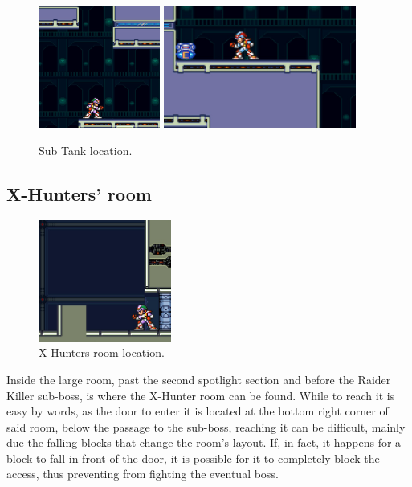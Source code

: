 \begin{figure}[htp]
	\centering
	\includegraphics[height=4cm]{figures/X2/Magna_centipede/Centipede_tank_1.png}
	\includegraphics[height=4cm]{figures/X2/Magna_centipede/Centipede_tank.png}
	\caption{Sub Tank location.}
\end{figure}

\subsection{X-Hunters' room}
\begin{figure}[htp]
	\centering
	\includegraphics[height=4cm]{figures/X2/Magna_centipede/Centipede_Hunter_room.png}
	\caption{X-Hunters room location.}
\end{figure}
Inside the large room, past the second spotlight section and before the Raider Killer sub-boss, is where the X-Hunter room can be found. While to reach it is easy by words, as the door to enter it is located at the bottom right corner of said room, below the passage to the sub-boss, reaching it can be difficult, mainly due the falling blocks that change the room's layout. If, in fact, it happens for a block to fall in front of the door, it is possible for it to completely block the access, thus preventing from fighting the eventual boss. 

